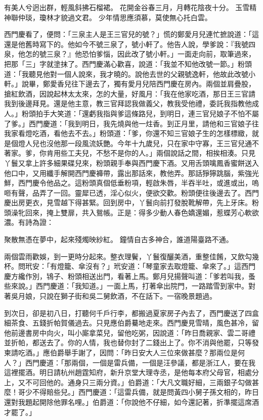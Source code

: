 \begin{showcontents}{}
有美人兮迥出群，輕風斜拂石榴裙。
花開金谷春三月，月轉花陰夜十分。
玉雪精神聯仲琰，瓊林才貌過文君。
少年情思應須慕，莫使無心托白雲。

西門慶看了，便問：「三泉主人是王三官兒的號？」慌的鄭愛月兒連忙摭說道：「這還是他舊時寫下的。他如今不號三泉了，號小軒了。他告人說，學爹說：『我號四泉，他怎的號三泉？』他恐怕爹惱，因此改了號小軒。」一面走向前，取筆過來，把那「三」字就塗抹了。西門慶滿心歡喜，說道：「我並不知他改號一節。」粉頭道：「我聽見他對一個人說來，我才曉的。說他去世的父親號逸軒，他故此改號小軒。」說畢，鄭愛香兒往下邊去了，獨有愛月兒陪西門慶在房內。兩個並肩疊股，搶紅飲酒，因說起林太太來，怎的大量，好風月：「我在他家吃酒，那日王三官請我到後邊拜見。還是他主意，教三官拜認我做義父，教我受他禮，委託我指教他成人。」粉頭拍手大笑道：「還虧我指與爹這條路兒，到明日，連三官兒娘子不怕不屬了爹。」西門慶道：「我到明日，我先燒與他一炷香。到正月里，請他和三官娘子往我家看燈吃酒，看他去不去。」粉頭道：「爹，你還不知三官娘子生的怎樣標緻，就是個燈人兒也沒他那一段風流妖艷。今年十九歲兒，只在家中守寡，王三官兒通不著家。爹，你肯用些工夫兒，不愁不是你的人。」兩個說話之間，相挨相湊。只見丫鬟又拿上許多細果碟兒來，粉頭親手奉與西門慶下酒。又用舌頭噙鳳香蜜餅送入他口中，又用纖手解開西門慶褲帶，露出那話來，教他弄。那話猙獰跳腦，紫強光鮮，西門慶令他品之。這粉頭真個低垂粉項，輕啟朱唇，半吞半吐，或進或出，嗚咂有聲，品弄了一回。靈犀已透，淫心似火，便欲交歡。粉頭便往後邊去了。西門慶出房更衣，見雪越下得甚緊。回到房中，丫鬟向前打發脫靴解帶，先上牙床。粉頭澡牝回來，掩上雙扉，共入鴛帳。正是：得多少動人春色嬌還媚，惹蝶芳心軟欲濃。有詩為證：

聚散無憑在夢中，起來殘燭映紗紅。
鐘情自古多神合，誰道陽臺路不通。

兩個雲雨歡娛，到一更時分起來。整衣理鬢，丫鬟復釃美酒，重整佳餚，又飲勾幾杯。問玳安：「有燈籠、傘沒有？」玳安道：「琴童家去取燈籠、傘來了。」這西門慶方纔作別，鴇子、粉頭相送出門，看著上馬。鄭月兒揚聲叫道：「爹若叫我，蚤些來說。」西門慶道：「我知道。」一面上馬，打著傘出院門，一路踏雪到家中。對著吳月娘，只說在獅子街和吳二舅飲酒，不在話下。一宿晚景題過。

到次日，卻是初八日，打聽何千戶行李，都搬過夏家房子內去了，西門慶送了四盒細茶食、五錢折帕賀儀過去。只見應伯爵驀地走來。西門慶見雪晴，風色甚冷，留他前邊書房中向火，叫小廝拿菜兒，留他吃粥，因說道：「昨日喬親家、雲二哥禮並折帕，都送去了。你的人情，我也替你封了二錢出上了。你不消與他罷，只等發柬請吃酒。」應伯爵舉手謝了，因問：「昨日安大人三位來做甚麼？那兩位是何人？」西門慶道：「那兩個，一個是雷兵備，一個是汪參議，都是浙江人，要在我這裡擺酒。明日請杭州趙霆知府，新升京堂大理寺丞，是他每本府父母官，相處分上，又不可回他的。通身只三兩分資。」伯爵道：「大凡文職好細，三兩銀子勾做甚麼！哥少不得賠些兒。」西門慶道：「這雷兵備，就是問黃四小舅子孫文相的，昨日還對我題起開除他罪名哩。」伯爵道：「你說他不仔細，如今還記著，折準擺這席酒才罷了。」


\end{showcontents}

